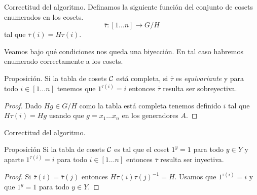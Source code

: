 \documentclass[aspectratio=169, 9pt]{beamer}
\newcommand{\In}{[1 \dots n]}
\newcommand{\ol}{\overline}
\newcommand{\Co}{{\cal{C}}}
\begin{document}
\begin{frame}[fragile]{Correctitud del algoritmo.}
	Definamos la siguiente función del conjunto de cosets enumerados en los cosets.
	\[
	\ol \tau: \In \to G/H
	\]
	tal que $\ol \tau (i) = H \tau (i)$.
	
	Veamos bajo qué condiciones nos queda una biyección. 
	En tal caso habremos enumerado correctamente a los cosets.
	\medskip
	
	
	
	\begin{alertblock}{Proposición.}
		Si la tabla de cosets $\Co$ está completa, si $\ol \tau$ es \emph{equivariante} y para todo $i \in \In$ tenemos que $1^{\tau(i)} = i$ entonces $\ol \tau$ resulta ser sobreyectiva.
	\end{alertblock}
	
	
\begin{proof}
	Dado $Hg \in G/H$ como la tabla está completa tenemos definido $i$ tal que $H\tau(i) = Hg$ usando que $g = x_1 \dots x_n$ en los generadores $A$. 
\end{proof}
	
	
	
	
\end{frame}

\begin{frame}[fragile]{Correctitud del algoritmo.}
	\begin{alertblock}{Proposición}
		Si la tabla de cosets $\Co$ es tal que el coset $1^y = 1$ para todo $y \in Y$ y aparte $1^{\tau (i)} = i$ para todo $i \in \In$ entonces $\ol \tau$ resulta ser inyectiva.
	\end{alertblock}
	
	\begin{proof}
		Si $\ol \tau (i) = \ol \tau (j)$ entonces $H \tau (i) \tau (j)^{-1} = H$.
		Usamos que $ 1^{\tau(i)} = i$ y que $1^y = 1$ para todo $y \in Y$. 
	\end{proof}
\end{frame}
\end{document}
